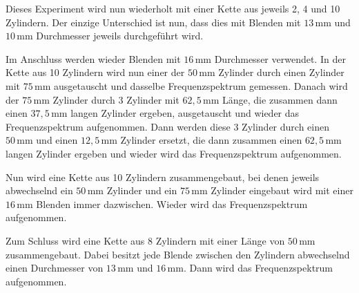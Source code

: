 Dieses Experiment wird nun wiederholt mit einer Kette aus jeweils 2, 4 und 10 Zylindern. Der einzige Unterschied ist nun, dass dies mit Blenden mit $13 \, \mathrm{mm}$ und $10 \, \mathrm{mm}$ Durchmesser jeweils durchgeführt wird. \newline

Im Anschluss werden wieder Blenden mit $16 \, \mathrm{mm}$ Durchmesser verwendet. In der Kette aus 10 Zylindern wird nun einer der $50 \, \mathrm{mm}$ Zylinder durch einen Zylinder mit $75 \, \mathrm{mm}$ ausgetauscht und dasselbe Frequenzspektrum gemessen. Danach wird der $75 \, \mathrm{mm}$ Zylinder durch 3 Zylinder mit $62, \! 5 \, \mathrm{mm}$ Länge, die zusammen dann einen $37, \! 5 \, \mathrm{mm}$ langen Zylinder ergeben, ausgetauscht und wieder das Frequenzspektrum aufgenommen. Dann werden diese 3 Zylinder durch einen $50 \, \mathrm{mm}$ und einen $12, \! 5 \, \mathrm{mm}$ Zylinder ersetzt, die dann zusammen einen $62, \! 5 \, \mathrm{mm}$ langen Zylinder ergeben und wieder wird das Frequenzspektrum aufgenommen. \newline

Nun wird eine Kette aus 10 Zylindern zusammengebaut, bei denen jeweils abwechselnd ein $50 \, \mathrm{mm}$ Zylinder und ein $75 \, \mathrm{mm}$ Zylinder eingebaut wird mit einer $16 \, \mathrm{mm}$ Blenden immer dazwischen. Wieder wird das Frequenzspektrum aufgenommen. \newline

Zum Schluss wird eine Kette aus 8 Zylindern mit einer Länge von $50 \, \mathrm{mm}$ zusammengebaut. Dabei besitzt jede Blende zwischen den Zylindern abwechselnd einen Durchmesser von $13 \, \mathrm{mm}$ und $16 \, \mathrm{mm}$. Dann wird das Frequenzspektrum aufgenommen.

